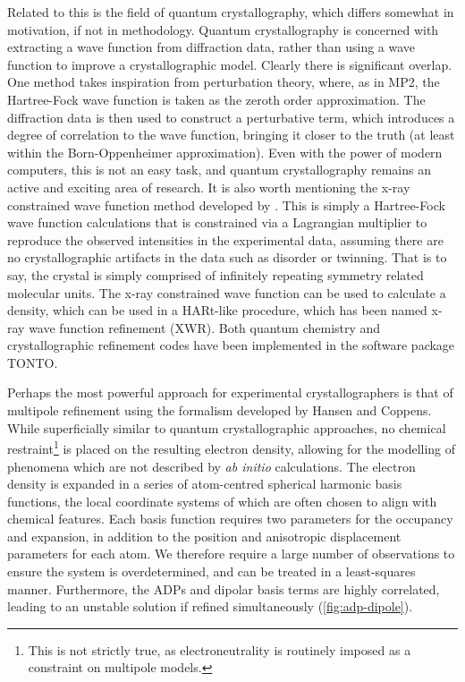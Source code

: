 \begin{refsection}
Related to this is the field of quantum crystallography, which differs somewhat in motivation, if not in methodology.
Quantum crystallography is concerned with extracting a wave function from diffraction data, rather than using a wave function to improve a crystallographic model.
Clearly there is significant overlap.
One method takes inspiration from perturbation theory, where, as in MP2, the Hartree-Fock wave function is taken as the zeroth order approximation.
The diffraction data is then used to construct a perturbative term, which introduces a degree of correlation to the wave function, bringing it closer to the truth (at least within the Born-Oppenheimer approximation).\autocite{Weiss1962}
Even with the power of modern computers, this is not an easy task, and quantum crystallography remains an active and exciting area of research.
It is also worth mentioning the x-ray constrained wave function method developed by \citeauthor{Grimwood2003}.\autocite{Grimwood2003}
This is simply a Hartree-Fock wave function calculations that is constrained via a Lagrangian multiplier to reproduce the observed intensities in the experimental data, assuming there are no crystallographic artifacts in the data such as disorder or twinning.
That is to say, the crystal is simply comprised of infinitely repeating symmetry related molecular units.
The x-ray constrained wave function can be used to calculate a density, which can be used in a HARt-like procedure, which has been named x-ray wave function refinement (XWR).\autocite{Woinska2017}
Both quantum chemistry and crystallographic refinement codes have been implemented in the software package TONTO.\autocite{Jayatilaka2003}

Perhaps the most powerful approach for experimental crystallographers is that of multipole refinement using the formalism developed by Hansen and Coppens.\autocite{Hansen1978}
While superficially similar to quantum crystallographic approaches, no chemical restraint\footnote{This is not strictly true, as electroneutrality is routinely imposed as a constraint on multipole models.} is placed on the resulting electron density, allowing for the modelling of phenomena which are not described by \emph{ab initio} calculations.
The electron density is expanded in a series of atom-centred spherical harmonic basis functions, the local coordinate systems of which are often chosen to align with chemical features.
Each basis function requires two parameters for the occupancy and expansion, in addition to the position and anisotropic displacement parameters for each atom.
We therefore require a large number of observations to ensure the system is overdetermined, and can be treated in a least-squares manner.
Furthermore, the ADPs and dipolar basis terms are highly correlated, leading to an unstable solution if refined simultaneously (\cref{fig:adp-dipole}).


\end{refsection}
